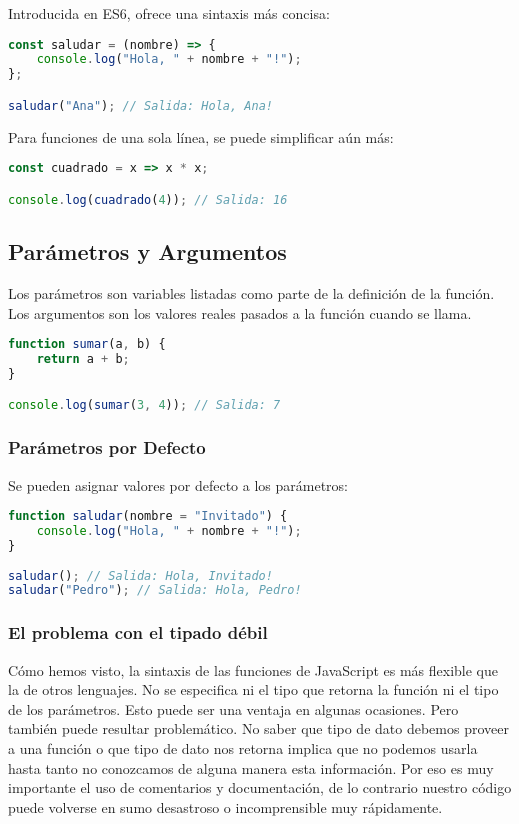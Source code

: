 \documentclass{book}
\begin{document}
Introducida en ES6, ofrece una sintaxis más concisa:

\begin{lstlisting}[language=JavaScript]
const saludar = (nombre) => {
    console.log("Hola, " + nombre + "!");
};

saludar("Ana"); // Salida: Hola, Ana!
\end{lstlisting}

Para funciones de una sola línea, se puede simplificar aún más:

\begin{lstlisting}[language=JavaScript]
const cuadrado = x => x * x;

console.log(cuadrado(4)); // Salida: 16
\end{lstlisting}

\subsection{Parámetros y Argumentos}

Los parámetros son variables listadas como parte de la definición de la función. Los argumentos son los valores reales pasados a la función cuando se llama.

\begin{lstlisting}[language=JavaScript]
function sumar(a, b) {
    return a + b;
}

console.log(sumar(3, 4)); // Salida: 7
\end{lstlisting}

\subsubsection{Parámetros por Defecto}

Se pueden asignar valores por defecto a los parámetros:

\begin{lstlisting}[language=JavaScript]
function saludar(nombre = "Invitado") {
    console.log("Hola, " + nombre + "!");
}
    
saludar(); // Salida: Hola, Invitado!
saludar("Pedro"); // Salida: Hola, Pedro!
\end{lstlisting}

\subsubsection{El problema con el tipado débil}
Cómo hemos visto, la sintaxis de las funciones de JavaScript es más flexible que la de otros lenguajes.
No se especifica ni el tipo que retorna la función ni el tipo de los parámetros. Esto puede ser una ventaja en algunas ocasiones. Pero también puede resultar problemático.
No saber que tipo de dato debemos proveer a una función o que tipo de dato nos retorna implica que no podemos usarla hasta tanto no conozcamos de alguna manera esta información.
Por eso es muy importante el uso de comentarios y documentación, de lo contrario nuestro código puede volverse en sumo desastroso o incomprensible muy rápidamente.
\end{document}
